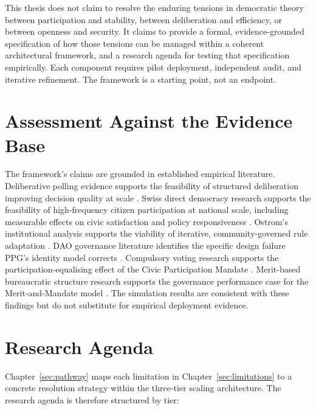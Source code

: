 \documentclass[12pt,a4paper,oneside]{report}
\begin{document}
This thesis does not claim to resolve the enduring tensions in democratic theory between participation and stability, between deliberation and efficiency, or between openness and security. It claims to provide a formal, evidence-grounded specification of how those tensions can be managed within a coherent architectural framework, and a research agenda for testing that specification empirically. Each component requires pilot deployment, independent audit, and iterative refinement. The framework is a starting point, not an endpoint.

\section{Assessment Against the Evidence Base}

The framework's claims are grounded in established empirical literature. Deliberative polling evidence supports the feasibility of structured deliberation improving decision quality at scale \citep{fishkin2018stanford}. Swiss direct democracy research supports the feasibility of high-frequency citizen participation at national scale, including measurable effects on civic satisfaction and policy responsiveness \citep{linder2010swiss, frey1994direct}. Ostrom's institutional analysis supports the viability of iterative, community-governed rule adaptation \citep{ostrom1990governing}. DAO governance literature identifies the specific design failure PPG's identity model corrects \citep{hassan2021decentralized, chohan2017dao}. Compulsory voting research supports the participation-equalising effect of the Civic Participation Mandate \citep{lijphart1997unequal}. Merit-based bureaucratic structure research supports the governance performance case for the Merit-and-Mandate model \citep{rauch2000bureaucratic}. The simulation results are consistent with these findings but do not substitute for empirical deployment evidence.

\section{Research Agenda}

Chapter~\ref{sec:pathway} maps each limitation in Chapter~\ref{sec:limitations} to a concrete resolution strategy within the three-tier scaling architecture. The research agenda is therefore structured by tier:
\end{document}
